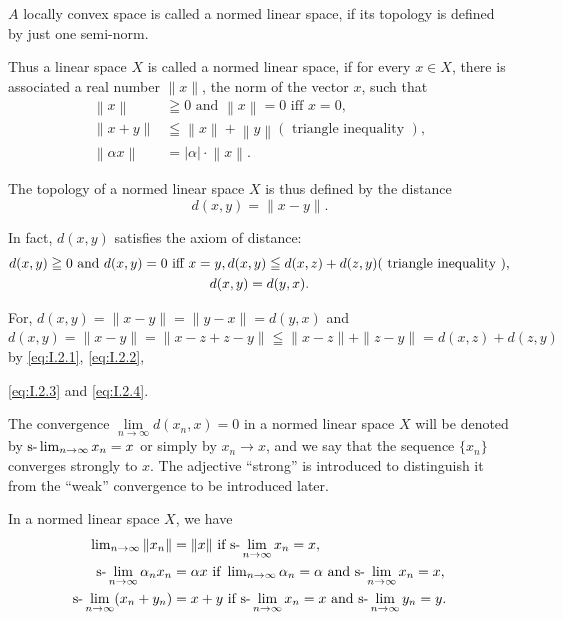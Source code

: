 \label{sec:I.2}

\begin{definition}\label{def:I.2.Definition.1} $A$ locally convex space is called a normed linear space, if its topology is defined by just one semi-norm. 
\end{definition}

Thus a linear space $X$ is called a normed linear space, if for every $x \in X$, there is associated a real number $\|x\|$, the norm of the vector $x$, such that 
\begin{align}
\left\| x \right\|& \geqq 0 \text{ and } \left\| x \right\| = 0 \text{ iff } x = 0, \label{eq:I.2.1} \\
\left\| x + y \right\|& \leqq \left\| x \right\| + \left\| y \right\| (\text{ triangle inequality }), \label{eq:I.2.2} \\
\left\| \alpha x \right\|& = | \alpha | \cdot \left\| x \right\|. \label{eq:I.2.3}
\end{align}

The topology of a normed linear space $X$ is thus defined by the distance 
\begin{equation}\label{eq:I.2.4}
d (x, y) = \| x- y \|.
\end{equation}

In fact, $d(x, y)$ satisfies the axiom of distance: 
\begin{gather}d (x, y) \geqq 0 \text{ and } d (x, y) = 0 \text{ iff } x = y, d (x, y) \leqq d (x, z) + d (z, y) (\text{ triangle inequality }), \notag \\d (x, y) = d (y, x). \notag
\end{gather}

For, $d(x, y) = \|x- y\| = \|y- x\| = d(y, x)$ and $d(x, y) = \|x- y\| = \|x- z + z- y\| \leqq \|x- z\| + \|z- y\| = d(x, z) + d(z, y)$ by \eqref{eq:I.2.1}, \eqref{eq:I.2.2}, 

\eqref{eq:I.2.3} and \eqref{eq:I.2.4}. 

The convergence $\lim\limits_{n\to\infty}d(x_n,x)=0$ in a normed linear space $X$ will be denoted by $\text{s-}\lim\nolimits_{n\to\infty}x_n=x$ or simply by $x_n\to x$, and we say that the sequence $\{x_n\}$ converges strongly to $x$. The adjective ``strong'' is introduced to distinguish it from the ``weak'' convergence to be introduced later. 

\begin{proposition}\label{prop:I.2.Proposition.1} In a normed linear space $X$, we have 
\begin{align}
\lim\nolimits_{n \rightarrow \infty} \| x_{n} \|& = \| x \| \text{ if } \text{s-}\lim_{n \rightarrow \infty} x_{n} = x, \label{eq:I.2.5} \\
\text{s-}\lim_{n \to \infty} \alpha_{n} x_{n}& = \alpha x \text{ if } \lim\nolimits_{n \to \infty} \alpha_{n} = \alpha \text{ and } \text{s-}\lim_{n \to \infty} x_{n} = x, \label{eq:I.2.6} \\
\text{s-}\lim_{n \to \infty} (x_{n} + y_{n})& = x + y \text{ if } \text{s-}\lim_{n \to \infty} x_{n} = x \text{ and } \text{s-}\lim_{n \to \infty} y_{n} = y. \label{eq:I.2.7}
\end{align}
\end{proposition}

